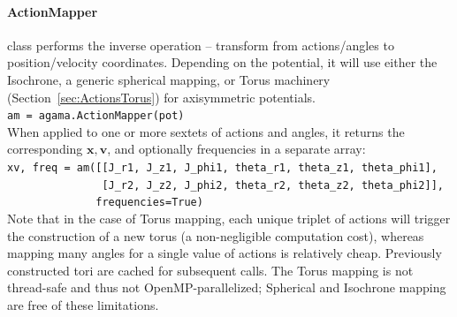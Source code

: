 \documentclass[12pt]{article}
\newcommand{\bv}{\boldsymbol{v}}
\newcommand{\bx}{\boldsymbol{x}}
\let\oldparagraph\paragraph
\renewcommand{\paragraph}[1]{\vspace{-2mm}\oldparagraph{#1}}
\begin{document}
\paragraph{ActionMapper} class performs the inverse operation -- transform from actions/angles to position/velocity coordinates. Depending on the potential, it will use either the Isochrone, a generic spherical mapping, or Torus machinery (Section~\ref{sec:ActionsTorus}) for axisymmetric potentials.\\[1mm]
\texttt{am = agama.ActionMapper(pot)}\\[2mm]
When applied to one or more sextets of actions and angles, it returns the corresponding $\bx,\bv$, and optionally frequencies in a separate array:\\[1mm]
\texttt{xv, freq = am([[J_r1, J_z1, J_phi1, theta_r1, theta_z1, theta_phi1],}\\
\texttt{\mbox{}~~~~~~~~~~~~~~~[J_r2, J_z2, J_phi2, theta_r2, theta_z2, theta_phi2]],}\\
\texttt{\mbox{}~~~~~~~~~~~~~~frequencies=True)}\\[1mm]
Note that in the case of Torus mapping, each unique triplet of actions will trigger the construction of a new torus (a non-negligible computation cost), whereas mapping many angles for a single value of actions is relatively cheap. Previously constructed tori are cached for subsequent calls. The Torus mapping is not thread-safe and thus not OpenMP-parallelized; Spherical and Isochrone mapping are free of these limitations.
\end{document}
